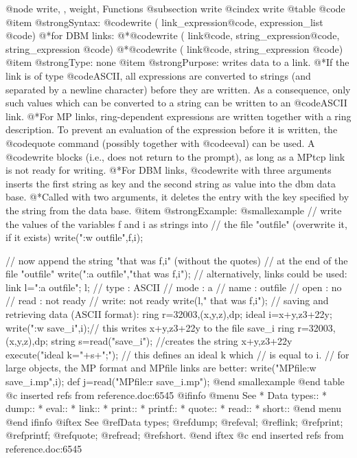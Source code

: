 {{{{{{{@node  write,  , weight, Functions
@subsection write
@cindex write
@table @code
@item @strong{Syntax:}
@code{write (} link_expression@code{,} expression_list @code{)}
@*for DBM links:
@*@code{write (} link@code{,} string_expression@code{,} string_expression @code{)}
@*@code{write (} link@code{,} string_expression @code{)}
@item @strong{Type:}
none
@item @strong{Purpose:}
writes data to a link.
@*If the link is of type @code{ASCII}, all expressions are converted to
strings  (and separated by a newline character) before they are
written. As a consequence, only such values which can be converted to a
string can be written to an  @code{ASCII} link.
@*For MP links,
ring-dependent expressions are written together with a ring
description. To prevent an evaluation of the expression before it is
written, the @code{quote} command (possibly together with @code{eval})
can be used. A @code{write} blocks (i.e., does not return to the prompt),
as long as a MPtcp link is not ready for writing.
@*For DBM links, @code{write} with three arguments inserts the first
string as key and the second string as value into the dbm data
base.
@*Called with two arguments, it deletes the entry with the key
specified by the string from the data base.
@item @strong{Example:}
@smallexample
// write the values of the variables f and i as strings into
// the file "outfile" (overwrite it, if it exists)
write(":w outfile",f,i);

// now append the string "that was f,i" (without the quotes)
// at the end of the file "outfile"
write(":a outfile","that was f,i");
// alternatively, links could be used:
link l=":a outfile"; l;
// type : ASCII
// mode : a
// name : outfile
// open : no
// read : not ready
// write: not ready
write(l," that was f,i");
// saving and retrieving data (ASCII format):
ring r=32003,(x,y,z),dp;
ideal i=x+y,z3+22y;
write(":w save_i",i);// this writes x+y,z3+22y to the file save_i
ring r=32003,(x,y,z),dp;
string s=read("save_i");   //creates the string x+y,z3+22y
execute("ideal k="+s+";"); // this defines an ideal k which
                           // is equal to i.
// for large objects, the MP format and MPfile links are better:
write("MPfile:w save_i.mp",i);
def j=read("MPfile:r save_i.mp");
@end smallexample
@end table
@c inserted refs from reference.doc:6545
@ifinfo
@menu
See
* Data types::
* dump::
* eval::
* link::
* print::
* printf::
* quote::
* read::
* short::
@end menu
@end ifinfo
@iftex
See
@ref{Data types};
@ref{dump};
@ref{eval};
@ref{link};
@ref{print};
@ref{printf};
@ref{quote};
@ref{read};
@ref{short}.
@end iftex
@c end inserted refs from reference.doc:6545


}}}}}}}
